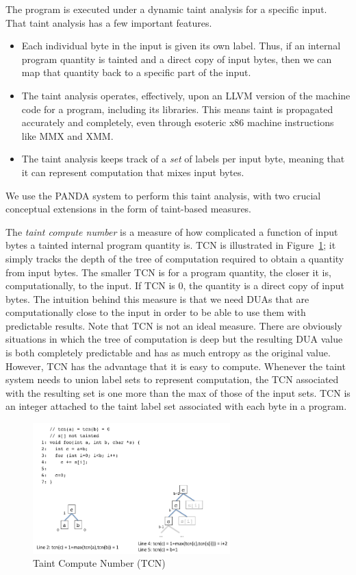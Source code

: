 The program is executed under a dynamic taint analysis for a specific input.
That taint analysis has a few important features.
\begin{itemize}
\item Each individual byte in the input is given its own label.
Thus, if an internal program quantity is tainted and a direct copy of input bytes, then we can map that quantity back to a specific part of the input.  
\item The taint analysis operates, effectively, upon an LLVM version of the machine code for a program, including its libraries.
This means taint is propagated accurately and completely, even through esoteric x86 machine instructions like MMX and XMM.
\item The taint analysis keeps track of a \emph{set} of labels per input byte, meaning that it can represent computation that mixes input bytes.
\end{itemize}
We use the PANDA system to perform this taint analysis, with two crucial conceptual extensions in the form of taint-based measures.

The \emph{taint compute number} is a measure of how complicated a function of input bytes a tainted internal program quantity is.
TCN is illustrated in Figure~\ref{fig:taint-compute-number}; it simply tracks the depth of the tree of computation required to obtain 
a quantity from input bytes.
The smaller TCN is for a program quantity, the closer it is, computationally, to the input.
If TCN is 0, the quantity is a direct copy of input bytes.
The intuition behind this measure is that we need DUAs that are computationally close to the input in order to be able to use them with predictable results.
Note that TCN is not an ideal measure.
There are obviously situations in which the tree of computation is deep but the resulting DUA value is both completely predictable and has as much entropy as the original value.
However, TCN has the advantage that it is easy to compute.
Whenever the taint system needs to union label sets to represent computation, the TCN associated with the resulting set is one more than the max of those of the 
input sets.
TCN is an integer attached to the taint label set associated with each byte in a program.


\begin{figure}
\centering
\includegraphics[width=3in]{tcn-example.png}
\caption{Taint Compute Number (TCN)}
\label{fig:taint-compute-number}
\end{figure}

